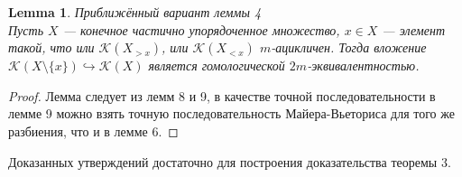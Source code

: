 \documentclass[a4paper, 12pt]{article}
\newtheorem{lemma}{Lemma}
\theoremstyle{definition}
\theoremstyle{remark}
\begin{document}
\begin{lemma}
  \textit{Приближённый вариант леммы 4}\\
  Пусть $X$ --- конечное частично упорядоченное множество, $x \in X$ --- элемент такой, что или $\mathcal{K}(X_{>x})$, или $\mathcal{K}(X_{<x})$ $m$-ацикличен. Тогда вложение $\mathcal{K}(X\setminus \{x\}) \hookrightarrow \mathcal{K}(X)$ является гомологической $2m$-эквивалентностью.
\end{lemma}
\begin{proof}
  Лемма следует из лемм 8 и 9, в качестве точной последовательности в лемме 9 можно взять точную последовательность Майера-Вьеториса для того же разбиения, что и в лемме 6.
\end{proof}

Доказанных утверждений достаточно для построения доказательства теоремы 3.
\end{document}
